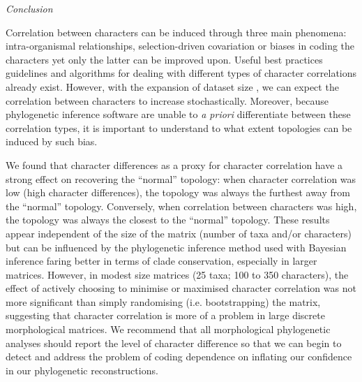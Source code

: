 \documentclass[12pt,letterpaper]{article}
\renewcommand{\subsection}[1]{%
\bigskip
\begin{center}
\begin{large}
\normalfont\itshape #1
\end{large}
\end{center}}
\begin{document}
\subsection{Conclusion}
Correlation between characters can be induced through three main phenomena: intra-organismal relationships, selection-driven covariation or biases in coding the characters yet only the latter can be improved upon. %
Useful best practices guidelines \citep[e.g.][]{Brazeau2011,simoes2017giant} and algorithms for dealing with different types of character correlations \citep[e.g. ][]{de2015parsimony,BrazeauNA} already exist.
However, with
the expansion of dataset size \citep[e.g.][> 1000 characters]{nithe2013,O'Leary08022013}, we can expect the correlation between characters to increase stochastically.
Moreover, because phylogenetic inference software are unable to \textit{a priori} differentiate between these correlation types, it is important to understand to what extent topologies can be induced by such bias.

We found that character differences as a proxy for character correlation have a strong effect on recovering the ``normal'' topology: when character correlation was low (high character differences), the topology was always the furthest away from the ``normal'' topology.
Conversely, when correlation between characters was high, the topology was always the closest to the ``normal'' topology.
These results appear independent of the size of the matrix (number of taxa and/or characters) but can be influenced by the phylogenetic inference method used with Bayesian inference faring better in terms of clade conservation, especially in larger matrices.
However, in modest size matrices (25 taxa; 100 to 350 characters), the effect of actively choosing to minimise or maximised character correlation was not more significant than simply randomising (i.e. bootstrapping) the matrix, suggesting that character correlation is more of a problem in large discrete morphological matrices.  
We recommend that all morphological phylogenetic analyses should report the level of character difference so that we can begin to detect and address the problem of coding dependence on inflating our confidence in our phylogenetic reconstructions. %
\end{document}
